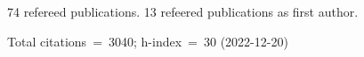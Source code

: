 74 refereed publications. 13 refeered publications as first author.

Total citations~=~3040; h-index~=~30 (2022-12-20)